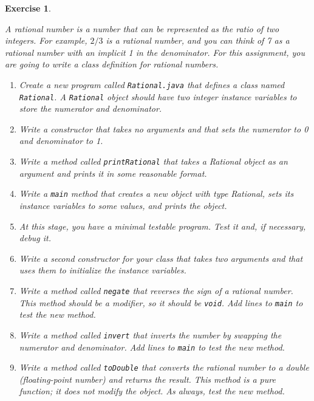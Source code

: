 \documentclass[12pt]{book}
\theoremstyle{exercise}
\newtheorem{exercise}{Exercise}[chapter]
\newcommand{\java}[1]{\verb"#1"}
\newcommand{\java}[1]{\lstinline{#1}} %
\begin{document}
\begin{exercise}
\label{ex.rational}

A rational number is a number that can be represented as the ratio of two integers.
For example, $2/3$ is a rational number, and you can think of 7 as a rational number with an implicit 1 in the denominator.
For this assignment, you are going to write a class definition for rational numbers.

\begin{enumerate}

\item Create a new program called \java{Rational.java} that defines a class named \java{Rational}.
A \java{Rational} object should have two integer instance variables to store the numerator and denominator.

\item Write a constructor that takes no arguments and that sets the numerator to 0 and denominator to 1.

\item Write a method called \java{printRational} that takes a Rational object as an argument and prints it in some reasonable format.

\item Write a \java{main} method that creates a new object with type Rational, sets its instance variables to some values, and prints the object.

\item At this stage, you have a minimal testable program.
Test it and, if necessary, debug it.

\item Write a second constructor for your class that takes two arguments and that uses them to initialize the instance variables.

\item Write a method called \java{negate} that reverses the sign of a rational number.
This method should be a modifier, so it should be \java{void}.
Add lines to \java{main} to test the new method.

\item Write a method called \java{invert} that inverts the number by swapping the numerator and denominator.
Add lines to \java{main} to test the new method.

\item Write a method called \java{toDouble} that converts the rational number to a double (floating-point number) and returns the result.
This method is a pure function; it does not modify the object.
As always, test the new method.


\end{enumerate}
\end{exercise}
\end{document}
